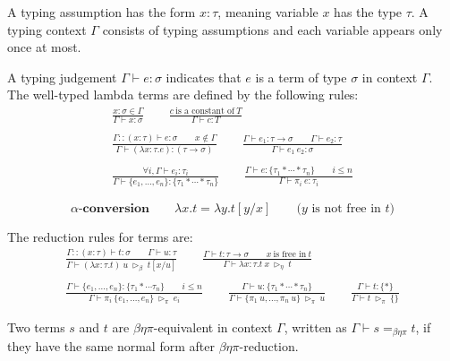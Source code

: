 \begin{definition}
    \label{def:STLC_tuple_typing_3}
    A typing assumption has the form $x : \tau$, meaning variable $x$ has the type $\tau$. A typing context $\Gamma$ consists of typing assumptions and each variable appears only once at most.

    A typing judgement $\Gamma \vdash e : \sigma$ indicates that $e$ is a term of type $\sigma$ in context $\Gamma$. The well-typed lambda terms are defined by the following rules:
    \begin{gather*}
        \frac{x : \sigma \in \Gamma}{\Gamma \vdash x : \sigma}
        \qquad \frac{c\ \textrm{is a constant of}\ T}{\Gamma \vdash c : T}\\
        \ \\
        \frac{\Gamma::(x : \tau) \vdash e : \sigma \qquad x \notin \Gamma}{\Gamma \vdash (\lambda x : \tau.e) : (\tau \to \sigma)}
        \qquad \frac{\Gamma \vdash e_1 : \tau \to \sigma \qquad \Gamma \vdash e_2 : \tau}{\Gamma \vdash e_1\ e_2 : \sigma}\\
        \ \\
        \frac{\forall i, \Gamma \vdash e_i : \tau_i}{\Gamma \vdash \{e_1, \dots, e_n \} : \{ \tau_1 * \cdots * \tau_n\}}
        \qquad 
        \frac{\Gamma \vdash e : \{ \tau_1 * \cdots * \tau_n \} \qquad i \leq n}{\Gamma \vdash \pi_i\ e : \tau_i}
    \end{gather*}
\end{definition}

\begin{definition}
  \label{def: STLC_eq_theory_3}
  $$
      \textbf{$\alpha$-conversion} \qquad\lambda x.t = \lambda y.t[y/x]\qquad \text{($y$ is not free in $t$)}
  $$
\end{definition}

\begin{definition}
    \label{def:STLC_tuple_red_3}
    The reduction rules for terms are:
    \begin{gather*}
        \frac{\Gamma::(x:\tau)\vdash t:\sigma\qquad \Gamma\vdash u:\tau}{\Gamma \vdash (\lambda x : \tau.t)\ u \ \triangleright_\beta\ t[x/u]}
        \qquad 
        \frac{\Gamma \vdash t : \tau \to \sigma\qquad x\ \textrm{is free in}\ t}{\Gamma \vdash \lambda x : \tau. t\ x\ \triangleright_\eta\ t}\\
        \ \\
        \frac{\Gamma \vdash \{e_1, \dots, e_n \} : \{ \tau_1 * \cdots \tau_n\}\qquad i \leq n}{\Gamma \vdash \pi_i\ \{e_1, \dots, e_n \}\ \triangleright_\pi\ e_i}
        \qquad
        \frac{\Gamma \vdash u : \{ \tau_1 * \cdots * \tau_n\}}{\Gamma \vdash \{\pi_1\ u, \dots, \pi_n\ u \}\ \triangleright_\pi\ u}
        \qquad
        \frac{\Gamma \vdash t : \{*\}}{\Gamma \vdash t\ \triangleright_\pi\ \{\}}
    \end{gather*}

    Two terms $s$ and $t$ are $\beta\eta\pi$-equivalent in context $\Gamma$, written as $\Gamma \vdash s =_{\beta\eta\pi} t$, if they have the same normal form after $\beta\eta\pi$-reduction.
\end{definition}


